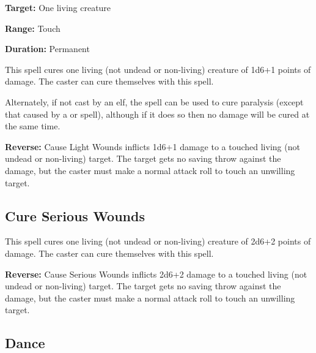 \begin{multicols*}{2}
{\textbf{Target:} One living creature

\textbf{Range:} Touch

\textbf{Duration:} Permanent}

This spell cures one living (not undead or non-living) creature of 1d6+1 points of damage. The caster can cure themselves with this spell.

Alternately, if not cast by an elf, the spell can be used to cure paralysis (except that caused by a  or  spell), although if it does so then no damage will be cured at the same time.

\textbf{Reverse:} \hypertarget{spell:Cause Light Wounds}{Cause Light Wounds} inflicts 1d6+1 damage to a touched living (not undead or non-living) target. The target gets no saving throw against the damage, but the caster must make a normal attack roll to touch an unwilling target.

\subsection{Cure Serious Wounds}\label{spell:Cure Serious Wounds}

This spell cures one living (not undead or non-living) creature of 2d6+2 points of damage. The caster can cure themselves with this spell.

\textbf{Reverse:} \hypertarget{spell:Cause Serious Wounds}{Cause Serious Wounds} inflicts 2d6+2 damage to a touched living (not undead or non-living) target. The target gets no saving throw against the damage, but the caster must make a normal attack roll to touch an unwilling target.

\subsection{Dance}\label{spell:Dance}
\end{multicols*}
